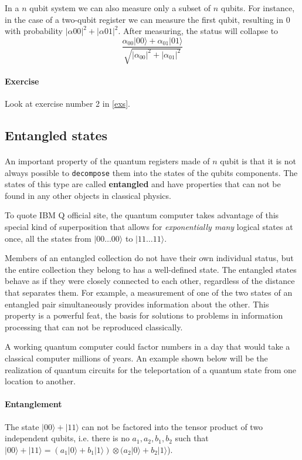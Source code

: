 \documentclass[a4paper,10pt]{article}
\begin{document}
In a $n$ qubit system we can also measure only a subset of $n$ qubits. For instance, in the case of a two-qubit register we can measure the first qubit, resulting in $0$ with probability $|\alpha{00}|^2 +|\alpha{01}|^2 $. After measuring, the status will collapse to
$$\frac{\alpha_{00}|00\rangle + \alpha_{01}|01\rangle}{\sqrt{|\alpha_{00}|^2 + |\alpha_{01}|^2}}$$

\paragraph{Exercise} Look at exercise number 2 in \autoref{exs}.

\subsection{Entangled states}

\paragraph{} An important property of the quantum registers made of $n$ qubit is that it is not always possible to \texttt{decompose} them into the states of the qubits components. The states of this type are called \textbf{entangled} and have properties that can not be found in any other objects in classical physics. 

To quote IBM Q official site, the quantum computer takes advantage of this special kind of superposition that allows for \textit{exponentially many} logical states at once, all the states from $|00\ldots00\rangle$ to $|11\ldots11\rangle$.

Members of an entangled collection do not have their own individual status, but the entire collection they belong to has a well-defined state. The entangled states behave as if they were closely connected to each other, regardless of the distance that separates them. For example, a measurement of one of the two states of an entangled pair simultaneously provides information about the other. This property is a powerful feat, the basis for solutions to problems in information processing that can not be reproduced classically.

A working quantum computer could factor numbers in a day that would take a classical computer millions of years. An example shown below will be the realization of quantum circuits for the teleportation of a quantum state from one location to another.

\paragraph{Entanglement}
\label{entanglement}
The state $|00\rangle + |11\rangle$ can not be factored into the tensor product of two independent qubits, i.e. there is no $a_1, a_2, b_1, b_2$ such that $|00\rangle + |11\rangle = (a_1 |0\rangle + b_1 |1\rangle) \otimes (a_2 |0\rangle + b_2 |1\rangle$).
\end{document}
